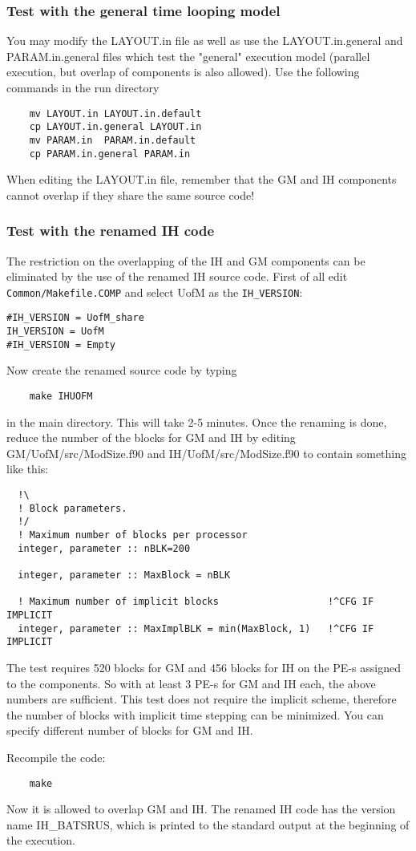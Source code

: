 \subsubsection{Test with the general time looping model}

You may modify the LAYOUT.in file as well as use the LAYOUT.in.general
and PARAM.in.general files which test the "general" execution model
(parallel execution, but overlap of components is also allowed). Use
the following commands in the run directory
\begin{verbatim}
	mv LAYOUT.in LAYOUT.in.default
	cp LAYOUT.in.general LAYOUT.in
	mv PARAM.in  PARAM.in.default
	cp PARAM.in.general PARAM.in 
\end{verbatim}
When editing the LAYOUT.in file, remember that the GM and IH
components cannot overlap if they share the same source code!

\subsubsection{Test with the renamed IH code}

The restriction on the overlapping of the IH and GM components
can be eliminated by the use of the renamed IH source code. 
First of all edit {\tt Common/Makefile.COMP} and
select UofM as the {\tt IH\_VERSION}:
\begin{verbatim}
#IH_VERSION = UofM_share
IH_VERSION = UofM
#IH_VERSION = Empty
\end{verbatim}
Now create the renamed source code by typing
\begin{verbatim}
	make IHUOFM
\end{verbatim}
in the main directory. This will take 2-5 minutes. Once the renaming
is done, reduce the number of the blocks for GM and IH by editing
GM/UofM/src/ModSize.f90 and IH/UofM/src/ModSize.f90 to contain
something like this:
\begin{verbatim}
  !\
  ! Block parameters.
  !/
  ! Maximum number of blocks per processor
  integer, parameter :: nBLK=200

  integer, parameter :: MaxBlock = nBLK

  ! Maximum number of implicit blocks                   !^CFG IF IMPLICIT
  integer, parameter :: MaxImplBLK = min(MaxBlock, 1)   !^CFG IF IMPLICIT
\end{verbatim}
The test requires 520 blocks for GM and 456 blocks for IH on the PE-s
assigned to the components. So with at least 3 PE-s for GM and IH each,
the above numbers are sufficient. This test does not require the implicit
scheme, therefore the number of blocks with implicit time stepping can
be minimized. You can specify different number of blocks for GM and IH. 

Recompile the code:
\begin{verbatim}
	make
\end{verbatim}
Now it is allowed to overlap GM and IH. The renamed IH code has the 
version name IH\_BATSRUS, which is printed to the standard output at the
beginning of the execution.


%
